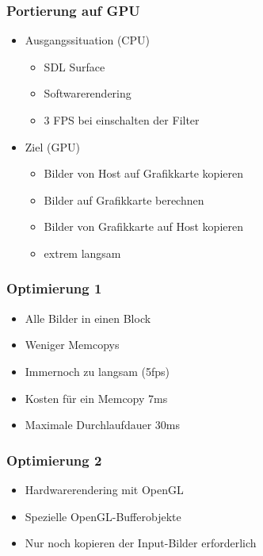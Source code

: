 \documentclass[compress]{beamer}
\begin{document}
\begin{frame}
\frametitle{Portierung auf GPU}
\begin{itemize}
\item Ausgangssituation (CPU)
	\begin{itemize}
		\item SDL Surface
		\item Softwarerendering
		\item 3 FPS bei einschalten der Filter
	\end{itemize}
\item Ziel (GPU)
	\begin{itemize}
		\item Bilder von Host auf Grafikkarte kopieren
		\item Bilder auf Grafikkarte berechnen
		\item Bilder von Grafikkarte auf Host kopieren
		\item extrem langsam 
	\end{itemize}
\end{itemize}
\end{frame}

\begin{frame}
\frametitle{Optimierung 1}
\begin{itemize}
\item Alle Bilder in einen Block
\item Weniger Memcopys
\item Immernoch zu langsam (5fps)
\item Kosten für ein Memcopy 7ms
\item Maximale Durchlaufdauer 30ms
\end{itemize}
\end{frame}

\begin{frame}
\frametitle{Optimierung 2}
\begin{itemize}
\item Hardwarerendering mit OpenGL
\item Spezielle OpenGL-Bufferobjekte
\item Nur noch kopieren der Input-Bilder erforderlich
\end{itemize}
\end{frame}
\end{document}
